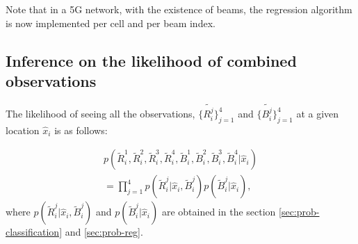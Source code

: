 \documentclass[conference, 10pt]{IEEEtran}
\begin{document}
Note that in a 5G network, with the existence of beams, the regression algorithm is now implemented per cell and per beam index.

\subsection{Inference on the likelihood of combined observations}
\label{sec:prob-combined}
The likelihood of seeing all the observations, $\{\tilde{R^j_i}\}_{j=1}^4$ and $\{\tilde{B^j_i}\}_{j=1}^4$ at a given location $\hat{x}_{i}$ is as follows:

\begin{equation} 
\begin{split}
	p(\tilde{R}^1_i, \tilde{R}^2_i, \tilde{R}^3_i,\tilde{R}^4_i, \tilde{B}^1_i, \tilde{B}^2_i, \tilde{B}^3_i, \tilde{B}^4_i|\hat{x}_{i})
	\\
	=\prod_{j=1}^4 p(\tilde{R}^j_i|\hat{x}_{i}, \tilde{B}^j_i)p(\tilde{B}^j_i|\hat{x}_{i}),
\end{split}
\label{eqn:combined}
\end{equation}
where $p(\tilde{R}^j_i|\hat{x}_{i}, \tilde{B}^j_i)$ and $p(\tilde{B}^j_i|\hat{x}_{i})$ are obtained in the section \ref{sec:prob-classification} and \ref{sec:prob-reg}.


\end{document}

